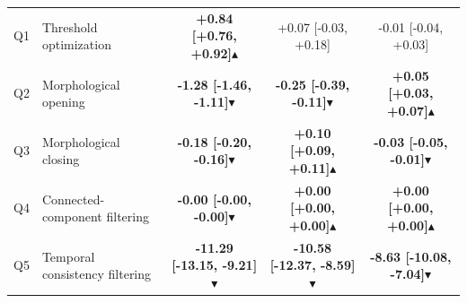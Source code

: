 \begin{table}[t]
{\begin{tabular}{@{}llccc@{}}
\midrule
Q1 & Threshold optimization & \textbf{+0.84 [+0.76, +0.92]}$\blacktriangle$ & +0.07 [-0.03, +0.18] & -0.01 [-0.04, +0.03] \\
Q2 & Morphological opening & \textbf{-1.28 [-1.46, -1.11]}$\blacktriangledown$ & \textbf{-0.25 [-0.39, -0.11]}$\blacktriangledown$ & \textbf{+0.05 [+0.03, +0.07]}$\blacktriangle$ \\
Q3 & Morphological closing & \textbf{-0.18 [-0.20, -0.16]}$\blacktriangledown$ & \textbf{+0.10 [+0.09, +0.11]}$\blacktriangle$ & \textbf{-0.03 [-0.05, -0.01]}$\blacktriangledown$ \\
Q4 & Connected-component filtering & \textbf{-0.00 [-0.00, -0.00]}$\blacktriangledown$ & \textbf{+0.00 [+0.00, +0.00]}$\blacktriangle$ & \textbf{+0.00 [+0.00, +0.00]}$\blacktriangle$ \\
Q5 & Temporal consistency filtering & \textbf{-11.29 [-13.15, -9.21]}$\blacktriangledown$ & \textbf{-10.58 [-12.37, -8.59]}$\blacktriangledown$ & \textbf{-8.63 [-10.08, -7.04]}$\blacktriangledown$ \\
\bottomrule
\end{tabular}}
\end{table}
